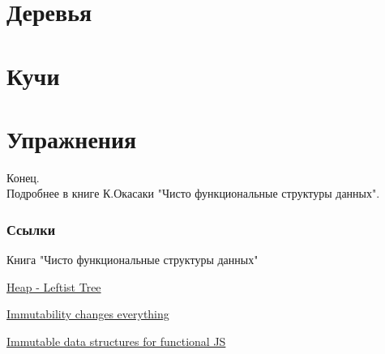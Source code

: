 \documentclass[aspectratio=169
  , xcolor={svgnames}
  , hyperref=
      { colorlinks
      , urlcolor=DarkBlue 
      }  
  , russian  %
  ]{beamer}
\theoremstyle{exerciseStyle1}
\begin{document}
\section{Деревья}



\section{Кучи}


%

\section{Упражнения}



\begin{frame}
\begin{center}
  {\Huge Конец.}\\
  
  Подробнее в книге К.Окасаки "Чисто функциональные структуры данных".
\end{center}
\end{frame}


\begin{frame}%
\frametitle<presentation>{Ссылки}
\begin{thebibliography}{10}
  Книга "Чисто функциональные структуры данных"

  \href{http://typeocaml.com/2015/03/12/heap-leftist-tree/}{Heap - Leftist Tree}
  
  \href{https://doi.org/10.1145/2857274.2884038}{Immutability changes everything}
  
  \href{https://www.youtube.com/watch?v=Wo0qiGPSV-s}{Immutable data structures for functional JS}
  
\end{thebibliography}
\end{frame}
\end{document}
